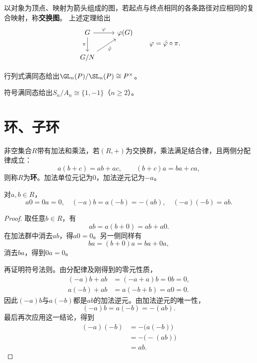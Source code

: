 \begin{definition}
\label{p2:concept:c1-l762}以对象为顶点、映射为箭头组成的图，若起点与终点相同的各条路径对应相同的复合映射，称\textbf{交换图}。
上述定理给出
\[
\begin{tikzcd}
G \arrow[r,"\varphi"] \arrow[d,"\pi"'] & \varphi(G)\\
G/N \arrow[ur,"\bar\varphi"'] &
\end{tikzcd}
\qquad\varphi=\bar\varphi\circ\pi.
\]
\end{definition}

\begin{example}
行列式满同态给出$\GL_n(P)/\SL_n(P)\cong P^\times$。

符号满同态给出$S_n/A_n\cong\{1,-1\}$（$n\geq2$）。
\end{example}

\section{环、子环}
\begin{definition}
\label{p2:concept:c1-l781}非空集合$R$带有加法和乘法，若$(R,+)$为交换群，乘法满足结合律，且两侧分配律成立：
\[
a(b+c)=ab+ac,\qquad(b+c)a=ba+ca,
\]
\label{p2:concept:c1-l785}则称$R$为\textbf{环}。加法单位元记为$0$，加法逆元记为$-a$。
\end{definition}



\begin{proposition}
对$a,b\in R$，
\[
a0=0a=0,\quad(-a)b=a(-b)=-(ab),\quad(-a)(-b)=ab.
\]
\end{proposition}
\begin{proof}
取任意$b\in R$，有
\[
ab=a(b+0)=ab+a0.
\]
在加法群中消去$ab$，得$a0=0$。另一侧同样有
\[
ba=(b+0)a=ba+0a,
\]
消去$ba$，得到$0a=0$。

再证明符号法则。由分配律及刚得到的零元性质，
\[
\begin{aligned}
(-a)b+ab&=(-a+a)b=0b=0,\\
a(-b)+ab&=a(-b+b)=a0=0.
\end{aligned}
\]
因此$(-a)b$与$a(-b)$都是$ab$的加法逆元。由加法逆元的唯一性，
\[
(-a)b=a(-b)=-(ab).
\]
最后再次应用这一结论，得到
\[
\begin{aligned}
(-a)(-b)
&=-\bigl(a(-b)\bigr)\\
&=-\bigl(-(ab)\bigr)\\
&=ab.
\end{aligned}
\]
\end{proof}

